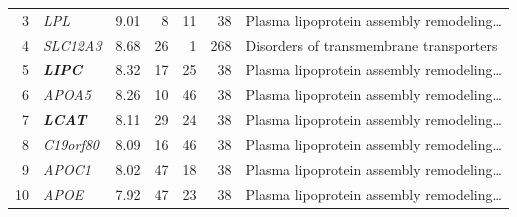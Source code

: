 \begin{table}[!t]
\begin{tabular}{rlrrrrl}
3 & \textit{LPL} & 9.01 & 8 & 11 & 38 & Plasma lipoprotein assembly remodeling\ldots \\
4 & \textit{SLC12A3} & 8.68 & 26 & 1 & 268 & Disorders of transmembrane transporters \\
5 & \textbf{\textit{LIPC}} & 8.32 & 17 & 25 & 38 & Plasma lipoprotein assembly remodeling\ldots \\
6 & \textit{APOA5} & 8.26 & 10 & 46 & 38 & Plasma lipoprotein assembly remodeling\ldots \\
7 & \textbf{\textit{LCAT}} & 8.11 & 29 & 24 & 38 & Plasma lipoprotein assembly remodeling\ldots \\
8 & \textit{C19orf80} & 8.09 & 16 & 46 & 38 & Plasma lipoprotein assembly remodeling\ldots \\
9 & \textit{APOC1} & 8.02 & 47 & 18 & 38 & Plasma lipoprotein assembly remodeling\ldots \\
10 & \textit{APOE} & 7.92 & 47 & 23 & 38 & Plasma lipoprotein assembly remodeling\ldots \\
\hline
\end{tabular}
\end{table}
